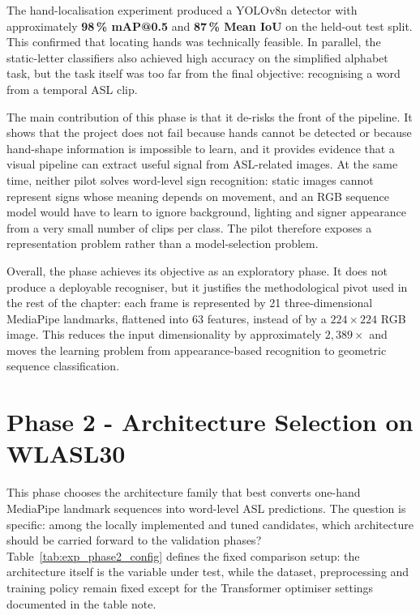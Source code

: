 \FloatBarrier

The hand-localisation experiment produced a YOLOv8n detector with approximately \textbf{98\,\%
mAP@0.5} and \textbf{87\,\% Mean IoU} on the held-out test split. This confirmed that locating
hands was technically feasible. In parallel, the static-letter classifiers also achieved high
accuracy on the simplified alphabet task, but the task itself was too far from the final objective:
recognising a word from a temporal ASL clip.

The main contribution of this phase is that it de-risks the front of the pipeline. It shows that
the project does not fail because hands cannot be detected or because hand-shape information is
impossible to learn, and it provides evidence that a visual pipeline can extract useful signal from
ASL-related images. At the same time, neither pilot solves word-level sign recognition: static
images cannot represent signs whose meaning depends on movement, and an RGB sequence model would
have to learn to ignore background, lighting and signer appearance from a very small number of
clips per class. The pilot therefore exposes a representation problem rather than a model-selection
problem.

Overall, the phase achieves its objective as an exploratory phase. It does not produce a deployable
recogniser, but it justifies the methodological pivot used in the rest of the chapter: each frame
is represented by 21 three-dimensional MediaPipe landmarks, flattened into 63 features, instead of
by a $224 \times 224$ RGB image. This reduces the input dimensionality by approximately
$2{,}389\times$ and moves the learning problem from appearance-based recognition to geometric
sequence classification.

\section{Phase 2 - Architecture Selection on WLASL30}
\label{sec:exp_phase2}

This phase chooses the architecture family that best converts one-hand MediaPipe landmark sequences
into word-level ASL predictions. The question is specific: among the locally implemented and tuned
candidates, which architecture should be carried forward to the validation phases?
Table~\ref{tab:exp_phase2_config} defines the fixed comparison setup: the architecture itself is
the variable under test, while the dataset, preprocessing and training policy remain fixed except
for the Transformer optimiser settings documented in the table note.

